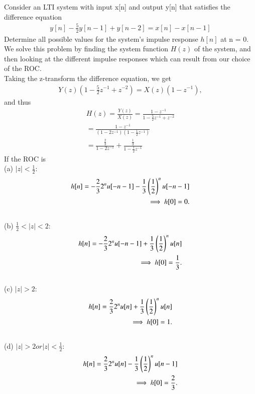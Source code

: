 \documentclass[journal,12pt,twocolumn]{IEEEtran}
\begin{document}
\problem Consider an LTI system with input x[n] and output y[n] that satisfies the difference equation
\begin{align}
	y[n] - \frac{5}{2}y[n-1] + y[n-2] = x[n] - x[n-1]
	\label{eq:transfer}
\end{align}
Determine all possible values for the system's impulse response $h[n]$ at n = 0.
\\
\solution We solve this problem by finding the system function $H(z)$ of the system, and then looking at the different impulse responses which can result from our choice of the ROC.
\\
Taking the z-transform the difference equation, we get 
\begin{align}
	Y(z)(1 - \frac{5}{2}z^{-1} + z^{-2}) = X(z)(1 - z^{-1}),
		 \label{eq:transfer-partial}
\end{align}
and thus  
\begin{align}
	H(z) = \frac{Y(z)}{X(z)} = \frac{1 - z^{-1}}{1 - \frac{5}{2}z^{-1} + z^{-2}}\\
    = \frac{1 - z^{-1}}{(1 - 2z^{-1})(1 - \frac{1}{2}z^{-1})}\\
    = \frac{\frac{2}{3}}{1 - 2z^{-1}} + \frac{\frac{1}{3}}{1 - \frac{1}{2}z^{-1}}
	\label{eq:anun}
\end{align}
If the ROC is
\\
(a) $|z| < \frac{1}{2}:$
\begin{align}
	h[n] = -\frac{2}{3}2^{n}u[-n-1] -\frac{1}{3}\left(\frac{1}{2}\right)^nu[-n-1]
    \\
    \implies h[0] = 0.
	\label{eq:delta-z}
\end{align}
\\
(b) $\frac{1}{2} < |z| < 2:$
\begin{align}
	h[n] = -\frac{2}{3}2^{n}u[-n-1] +\frac{1}{3}\left(\frac{1}{2}\right)^nu[n]
    \\
    \implies h[0] = \frac{1}{3}.
	\label{eq:delta-z}
\end{align}
\\
(c) $|z| > 2:$
\begin{align}
	h[n] = \frac{2}{3}2^{n}u[n] +\frac{1}{3}\left(\frac{1}{2}\right)^nu[n]
    \\
    \implies h[0] = 1.
	\label{eq:delta-z}
\end{align}
\\
(d) $|z| > 2 or |z| < \frac{1}{2}:$
\begin{align}
	h[n] = \frac{2}{3}2^{n}u[n] -\frac{1}{3}\left(\frac{1}{2}\right)^nu[n-1]
    \\
    \implies h[0] = \frac{2}{3}.
	\label{eq:delta-z}
\end{align}

\end{document}
